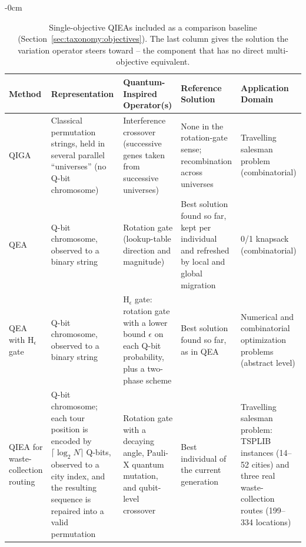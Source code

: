 \begin{table}[H]
  \centering
  \small
  \caption{Single-objective QIEAs included as a comparison baseline
    (Section~\ref{sec:taxonomy:objectives}). The last column gives the
    solution the variation operator steers toward -- the component that
    has no direct multi-objective equivalent.}
  \label{tab:feature-comparison-so}
  \begin{adjustwidth}{-\extralength}{0cm}
  \centering
  \begin{tabularx}{\linewidth}{@{}p{2.1cm}XXXX@{}}
    \toprule
    Method & Representation & Quantum-Inspired Operator(s) & Reference
    Solution & Application Domain \\
    \midrule
    QIGA~\citep{narayanan1996qiga} &
      Classical permutation strings, held in several parallel
      ``universes'' (no Q-bit chromosome) &
      Interference crossover (successive genes taken from successive
      universes) &
      None in the rotation-gate sense; recombination across
      universes &
      Travelling salesman problem (combinatorial) \\
    QEA~\citep{han2002qea} &
      Q-bit chromosome, observed to a binary string &
      Rotation gate (lookup-table direction and magnitude) &
      Best solution found so far, kept per individual and refreshed by
      local and global migration &
      0/1 knapsack (combinatorial) \\
    QEA with H$_\epsilon$ gate~\citep{han2004hepsilon} &
      Q-bit chromosome, observed to a binary string &
      H$_\epsilon$ gate: rotation gate with a lower bound $\epsilon$ on
      each Q-bit probability, plus a two-phase scheme &
      Best solution found so far, as in QEA &
      Numerical and combinatorial optimization problems (abstract
      level) \\
    QIEA for waste-collection routing~\citep{gilea2026waste} &
      Q-bit chromosome; each tour position is encoded by
      $\lceil \log_2 N \rceil$ Q-bits, observed to a city index, and the
      resulting sequence is repaired into a valid permutation &
      Rotation gate with a decaying angle, Pauli-X quantum mutation, and
      qubit-level crossover &
      Best individual of the current generation &
      Travelling salesman problem: TSPLIB instances (14--52 cities) and
      three real waste-collection routes (199--334 locations) \\
    \bottomrule
  \end{tabularx}
  \end{adjustwidth}
\end{table}
